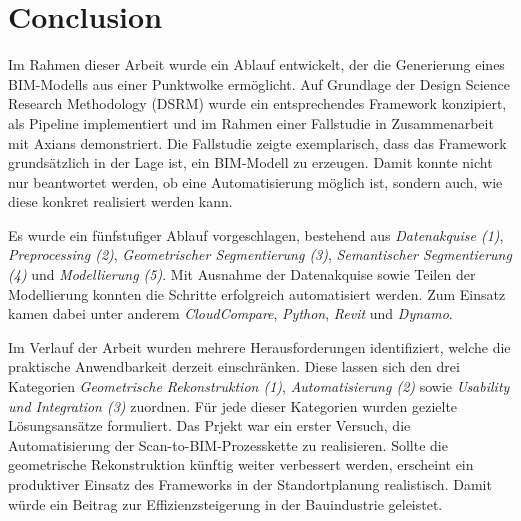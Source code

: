 \chapter{Conclusion}
\label{sec:conclusion}

\begin{German}
    Im Rahmen dieser Arbeit wurde ein Ablauf entwickelt, der die Generierung eines BIM-Modells aus einer Punktwolke ermöglicht. Auf Grundlage der Design Science Research Methodology (DSRM) wurde ein entsprechendes Framework konzipiert, als Pipeline implementiert und im Rahmen einer Fallstudie in Zusammenarbeit mit Axians demonstriert. Die Fallstudie zeigte exemplarisch, dass das Framework grundsätzlich in der Lage ist, ein BIM-Modell zu erzeugen. Damit konnte nicht nur beantwortet werden, ob eine Automatisierung möglich ist, sondern auch, wie diese konkret realisiert werden kann.

    Es wurde ein fünfstufiger Ablauf vorgeschlagen, bestehend aus \textit{Datenakquise (1)}, \textit{Preprocessing (2)}, \textit{Geometrischer Segmentierung (3)}, \textit{Semantischer Segmentierung (4)} und \textit{Modellierung (5)}. Mit Ausnahme der Datenakquise sowie Teilen der Modellierung konnten die Schritte erfolgreich automatisiert werden. Zum Einsatz kamen dabei unter anderem \textit{CloudCompare}, \textit{Python}, \textit{Revit} und \textit{Dynamo}.

    Im Verlauf der Arbeit wurden mehrere Herausforderungen identifiziert, welche die praktische Anwendbarkeit derzeit einschränken. Diese lassen sich den drei Kategorien \textit{Geometrische Rekonstruktion (1)}, \textit{Automatisierung (2)} sowie \textit{Usability und Integration (3)} zuordnen. Für jede dieser Kategorien wurden gezielte Lösungsansätze formuliert. Das Prjekt war ein erster Versuch, die Automatisierung der Scan-to-BIM-Prozesskette zu realisieren. Sollte die geometrische Rekonstruktion künftig weiter verbessert werden, erscheint ein produktiver Einsatz des Frameworks in der Standortplanung realistisch. Damit würde ein Beitrag zur Effizienzsteigerung in der Bauindustrie geleistet.
\end{German}


